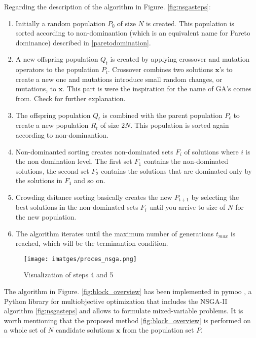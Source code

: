 \documentclass[a4paper,11pt, titlepage, twoside]{article}
\begin{document}
Regarding the description of the algorithm in Figure. \ref{fig:nsgasteps}:
\begin{enumerate}
    \item Initially a random population $P_0$ of size $N$ is created. This population is sorted according to non-dominantion (which is an equivalent name for Pareto dominance) described in \ref{paretodomination}.
    \item A new offspring population $Q_t$ is created by applying crossover and mutation operators to the population $P_t$. Crossover combines two solutions $\mathbf{x}$'s to create a new one and mutations introduce small random changes, or mutations, to $\mathbf{x}$.
    This part is were the inspiration for the name of GA's comes from. Check \cite{NSGAII} for further explanation.
    \item The offspring population $Q_t$ is combined with the parent population $P_t$ to create a new population $R_t$ of size $2N$. This population is sorted again according to non-dominantion.
    \item Non-dominanted sorting creates non-dominated sets $F_i$ of solutions where $i$ is the non domination level.
    The first set $F_1$ contains the non-dominated solutions, the second set $F_2$ contains the solutions that are dominated only by the solutions in $F_1$ and so on.
    \item Crowding dsitance sorting basically creates the new $P_{t+1}$ by selecting the best solutions in the non-dominated sets $F_i$ until you arrive to size of $N$ for the new population.
    \item The algorithm iterates until the maximum number of generations $t_{max}$ is reached, which will be the terminantion condition.

\end{enumerate}

\begin{figure}[H]
    \centering
    \texttt{[image: imatges/proces\_nsga.png]}
    \caption{Visualization of steps 4 and 5 \cite{NSGAII}}
    \label{fig:stpesnsga}
\end{figure}

The algorithm in Figure. \ref{fig:block_overview} has been implemented in pymoo \cite{pymoo}, a Python library for multiobjective optimization that includes the NSGA-II algorithm \ref{fig:nsgasteps} and allows to formulate mixed-variable problems.
It is worth mentioning that the proposed method \ref{fig:block_overview} is performed on a whole set of $N$ candidate solutions $\mathbf{x}$ from the population set $P$.
\end{document}

